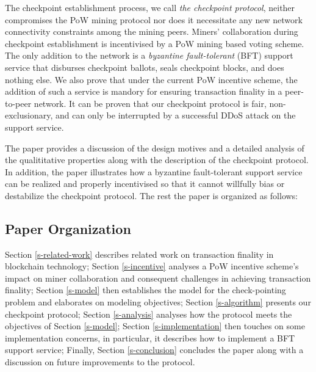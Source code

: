 The checkpoint establishment process, we call \textit{the checkpoint protocol}, neither compromises the PoW mining protocol nor does it necessitate any new network connectivity constraints among the mining peers. Miners' collaboration during checkpoint establishment is incentivised by a PoW mining based voting scheme. The only addition to the network is a \textit{byzantine fault-tolerant} (BFT) \cite{Lamport:1982:BGP:357172.357176} support service that disburses checkpoint ballots, seals checkpoint blocks, and does nothing else. We also prove that under the current PoW incentive scheme, the addition of such a service is mandory for ensuring transaction finality in a peer-to-peer network. It can be proven that our checkpoint protocol is fair, non-exclusionary, and can only be interrupted by a successful DDoS attack \cite{Yu:2013:DDS:2556385} on the support service.          

The paper provides a discussion of the design motives and a detailed analysis of the qualititative properties along with the description of the checkpoint protocol. In addition, the paper illustrates how a byzantine fault-tolerant support service can be realized and properly incentivised so that it cannot willfully bias or destabilize the checkpoint protocol. The rest the paper is organized as follows:

\subsection{Paper Organization}
Section \ref{s-related-work} describes related work on transaction finality in blockchain technology; Section \ref{s-incentive} analyses a PoW incentive scheme's impact on miner collaboration and consequent challenges in achieving transaction finality; Section \ref{s-model} then establishes the model for the check-pointing problem and elaborates on modeling objectives; Section \ref{s-algorithm} presents our checkpoint protocol; Section \ref{s-analysis} analyses how the protocol meets the objectives of Section \ref{s-model}; Section \ref{s-implementation} then touches on some implementation concerns, in particular, it describes how to implement a BFT support service; Finally, Section \ref{s-conclusion} concludes the paper along with a discussion on future improvements to the protocol.  
